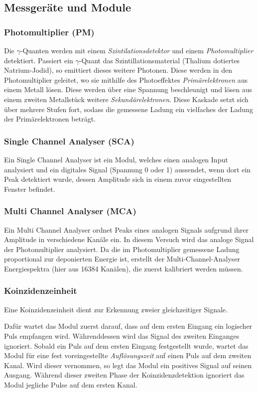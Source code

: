 \documentclass{../Misc/MontavonLaTeX/Montavon}
\begin{document}
\subsection{Messgeräte und Module}
\subsubsection{Photomultiplier (PM)}
Die $\gamma$-Quanten werden mit einem \emph{Szintilationsdetektor} und einem \emph{Photomultiplier} detektiert. Passiert ein $\gamma$-Quant das Szintillationsmaterial (Thalium dotiertes Natrium-Jodid), so emittiert dieses weitere Photonen. Diese werden in den Photomultiplier geleitet, wo sie mithilfe des Photoeffektes \emph{Primärelektronen} aus einem Metall lösen. Diese werden über eine Spannung beschleunigt und lösen aus einem zweiten Metallstück weitere \emph{Sekundärelektronen}. Diese Kaskade setzt sich über mehrere Stufen fort, sodass die gemessene Ladung ein vielfaches der Ladung der Primärelektronen beträgt.

\subsubsection{Single Channel Analyser (SCA)}
Ein Single Channel Analyser ist ein Modul, welches einen analogen Input analysiert und ein digitales Signal (Spannung 0 oder 1) aussendet, wenn dort ein Peak detektiert wurde, dessen Amplitude sich in einem zuvor eingestellten Fenster befindet.

\subsubsection{Multi Channel Analyser (MCA)}
Ein Multi Channel Analyser ordnet Peaks eines analogen Signals aufgrund ihrer Amplitude in verschiedene Kanäle ein. In diesem Versuch wird das analoge Signal der Photomultiplier analysiert. Da die im Photomultiplier gemessene Ladung proportional zur deponierten Energie ist, erstellt der Multi-Channel-Analyser Energiespektra (hier aus 16384 Kanälen), die zuerst kalibriert werden müssen. 

\subsubsection{Koinzidenzeinheit}
Eine Koinzidenzeinheit dient zur Erkennung zweier gleichzeitiger Signale. 

Dafür wartet das Modul zuerst darauf, dass auf dem ersten Eingang ein logischer Puls empfangen wird. Währenddessen wird das Signal des zweiten Einganges ignoriert.
Sobald ein Puls auf dem ersten Eingang festgestellt wurde, wartet das Modul für eine fest voreingestellte \emph{Auflösungszeit} auf einen Puls auf dem zweiten Kanal. Wird dieser vernommen, so legt das Modul ein positives Signal auf seinen Ausgang. 
Während dieser zweiten Phase der Koinzidenzdetektion ignoriert das Modul jegliche Pulse auf dem ersten Kanal.
\end{document}
